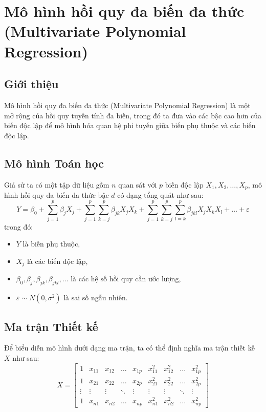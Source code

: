 \chapter{Mô hình hồi quy đa biến đa thức (Multivariate Polynomial Regression)}
\section{Giới thiệu}
Mô hình hồi quy đa biến đa thức (Multivariate Polynomial Regression) là một mở rộng của hồi quy tuyến tính đa biến, trong đó ta đưa vào các bậc cao hơn của biến độc lập để mô hình hóa quan hệ phi tuyến giữa biến phụ thuộc và các biến độc lập.

\section{Mô hình Toán học}
Giả sử ta có một tập dữ liệu gồm $n$ quan sát với $p$ biến độc lập $X_1, X_2, \dots, X_p$, mô hình hồi quy đa biến đa thức bậc $d$ có dạng tổng quát như sau:
\begin{equation}
    Y = \beta_0 + \sum_{j=1}^{p} \beta_j X_j + \sum_{j=1}^{p} \sum_{k=j}^{p} \beta_{jk} X_j X_k + \sum_{j=1}^{p} \sum_{k=j}^{p} \sum_{l=k}^{p} \beta_{jkl} X_j X_k X_l + \dots + \varepsilon
\end{equation}
trong đó:
\begin{itemize}
    \item $Y$ là biến phụ thuộc,
    \item $X_j$ là các biến độc lập,
    \item $\beta_0, \beta_j, \beta_{jk}, \beta_{jkl}, \dots$ là các hệ số hồi quy cần ước lượng,
    \item $\varepsilon \sim N(0, \sigma^2)$ là sai số ngẫu nhiên.
\end{itemize}

\section{Ma trận Thiết kế}
Để biểu diễn mô hình dưới dạng ma trận, ta có thể định nghĩa ma trận thiết kế $X$ như sau:
\begin{equation}
  X = \begin{bmatrix}
  1 & x_{11} & x_{12} & \dots & x_{1p} & x_{11}^2 & x_{12}^2 & \dots & x_{1p}^2 \\
  1 & x_{21} & x_{22} & \dots & x_{2p} & x_{21}^2 & x_{22}^2 & \dots & x_{2p}^2 \\
  \vdots & \vdots & \vdots & \ddots & \vdots & \vdots & \vdots & \ddots & \vdots \\
  1 & x_{n1} & x_{n2} & \dots & x_{np} & x_{n1}^2 & x_{n2}^2 & \dots & x_{np}^2
  \end{bmatrix}
  \end{equation}
  
